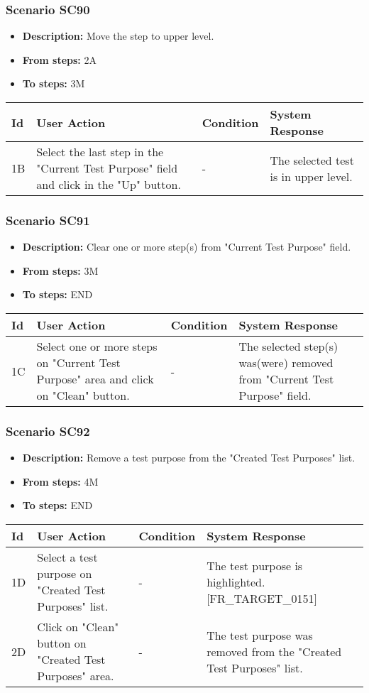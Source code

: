 \documentclass[a4paper,11pt]{article}
\newcommand{\bl}{\\ \hline}
\begin{document}
\subsubsection*{Scenario SC90}
\begin{itemize}
\item {\bf Description:} Move the step to upper level.
\item {\bf From steps:} 2A
\item {\bf To steps:} 3M
\end{itemize}
\begin{tabular}{|p{0.4in}|p{1.5in}|p{1.5in}|p{1.5in}|}
\hline
Id & User Action & Condition & System Response \bl 
1B & Select the last step in the "Current Test Purpose" field
						and click in the "Up" button. & - & The selected test is in upper level.\bl
\end{tabular}
\subsubsection*{Scenario SC91}
\begin{itemize}
\item {\bf Description:} Clear one or more step(s) from "Current Test Purpose"
					field.
\item {\bf From steps:} 3M
\item {\bf To steps:} END
\end{itemize}
\begin{tabular}{|p{0.4in}|p{1.5in}|p{1.5in}|p{1.5in}|}
\hline
Id & User Action & Condition & System Response \bl 
1C & Select one or more steps on "Current Test Purpose" area and
						click on "Clean" button.  & - & The selected step(s) was(were) removed from "Current Test
						Purpose" field. \bl
\end{tabular}
\subsubsection*{Scenario SC92}
\begin{itemize}
\item {\bf Description:} Remove a test purpose from the "Created Test Purposes"
					list.
\item {\bf From steps:} 4M
\item {\bf To steps:} END
\end{itemize}
\begin{tabular}{|p{0.4in}|p{1.5in}|p{1.5in}|p{1.5in}|}
\hline
Id & User Action & Condition & System Response \bl 
1D & Select a test purpose on "Created Test Purposes" list.
					 & - & The test purpose is highlighted. [FR_TARGET_0151]
					\bl
2D & Click on "Clean" button on "Created Test Purposes" area.
					 & - & The test purpose was removed from the "Created Test
						Purposes" list.\bl
\end{tabular}
\end{document}
